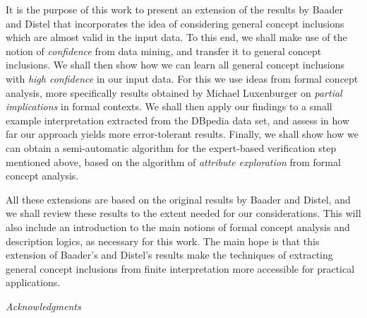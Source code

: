 It is the purpose of this work to present an extension of the results by Baader and Distel
that incorporates the idea of considering general concept inclusions which are almost
valid in the input data.  To this end, we shall make use of the notion of
\emph{confidence} from data mining, and transfer it to general concept inclusions.  We
shall then show how we can learn all general concept inclusions with \emph{high
  confidence} in our input data.  For this we use ideas from formal concept analysis, more
specifically results obtained by Michael Luxenburger on \emph{partial implications} in
formal contexts.  We shall then apply our findings to a small example interpretation
extracted from the DBpedia data set, and assess in how far our approach yields more
error-tolerant results.  Finally, we shall show how we can obtain a semi-automatic
algorithm for the expert-based verification step mentioned above, based on the algorithm
of \emph{attribute exploration} from formal concept analysis.

All these extensions are based on the original results by Baader and Distel, and we shall
review these results to the extent needed for our considerations.  This will also include
an introduction to the main notions of formal concept analysis and description logics, as
necessary for this work.  The main hope is that this extension of Baader's and Distel's
results make the techniques of extracting general concept inclusions from finite
interpretation more accessible for practical applications.

\bigskip\noindent%
\textit{Acknowledgments}\hspace*{2em}~

